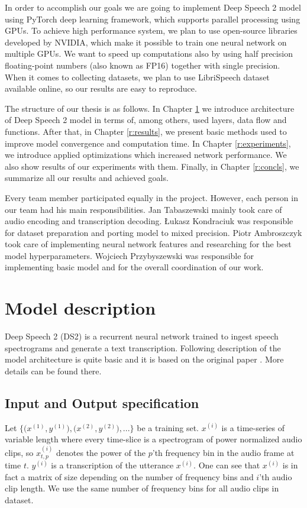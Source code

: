\documentclass[licencjacka,en]{pracamgr}
\begin{document}
	In order to accomplish our goals we are going to implement Deep Speech 2 model using PyTorch deep learning framework, which supports parallel processing using GPUs. To achieve high performance system, we plan to use open-source libraries developed by NVIDIA, which make it possible to train one neural network on multiple GPUs. We want to speed up computations also by using half precision floating-point numbers (also known as FP16) together with single precision. When it comes to collecting datasets, we plan to use LibriSpeech \cite{LIBRI} dataset available online, so our results are easy to reproduce.
	
	The structure of our thesis is as follows. In Chapter \ref{r:desc} we introduce architecture of Deep Speech 2 model in terms of, among others, used layers, data flow and functions. After that, in Chapter \ref{r:results}, we present basic methods used to improve model convergence and computation time. In Chapter \ref{r:experiments}, we introduce applied optimizations which increased network performance. We also show results of our experiments with them. Finally, in Chapter \ref{r:concls}, we summarize all our results and achieved goals.
	
	Every team member participated equally in the project. However, each person in our team had his main responsibilities. Jan Tabaszewski mainly took care of audio encoding and transcription decoding. Łukasz Kondraciuk was responsible for dataset preparation and porting model to mixed precision. Piotr Ambroszczyk took care of implementing neural network features and researching for the best model hyperparameters. Wojciech Przybyszewski was responsible for implementing basic model and for the overall coordination of our work.
	
	\chapter{Model description}\label{r:desc}
	
	Deep Speech 2 (DS2) is a recurrent neural network trained to ingest speech spectrograms and generate a text transcription.
	Following description of the model architecture is quite basic and it is based on the original paper \cite{DS2}. More details can be found there.
	
	\section{Input and Output specification} \label{sec:input}
	Let $\big\{\big(x^{(1)}, y^{(1)}\big), \big(x^{(2)}, y^{(2)}\big), ...\big\}$ be a training set. $x^{(i)}$ is a time-series of variable length where every time-slice is a spectrogram of power
	normalized audio clips, so $x^{(i)}_{t,p}$ denotes the power of the $p$’th frequency bin in the audio frame at time $t$. $y^{(i)}$ is a transcription of the utterance $x^{(i)}$. One can see that $x^{(i)}$ is in fact a matrix of size depending on the number of frequency bins and $i$'th audio clip length. We use the same number of frequency bins for all audio clips in dataset.
	
\end{document}

